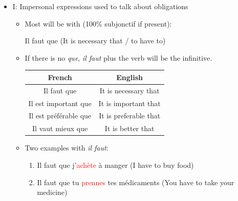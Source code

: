 \documentclass{book}
\begin{document}
\begin{itemize}
            \item I: Impersonal expressions used to talk about obligations
            \begin{itemize}
                \item Most will be with (100\% subjonctif if present):
                \begin{center}
                    Il faut que (It is necessary that / to have to)
                \end{center}

                \item If there is no \textit{que}, \textit{il faut} plus the verb will be the infinitive.
                \begin{center}
                    \begin{tabular}{|c|c|}
                        \hline
                        \textbf{French} & \textbf{English} \\
                        \hline
                        Il faut que & It is necessary that \\
                        \hline
                        Il est important que & It is important that \\
                        \hline
                        Il est préférable que & It is preferable that \\
                        \hline
                        Il vaut mieux que & It is better that \\
                        \hline
                    \end{tabular}
                \end{center}

                \item Two examples with \textit{il faut}:
                \begin{enumerate}
                    \item Il faut que j'\textcolor{red}{achète} à manger (I have to buy food)
                    \item Il faut que tu \textcolor{red}{prennes} tes médicaments (You have to take your medicine)
                \end{enumerate}


\end{itemize}
\end{itemize}
\end{document}
